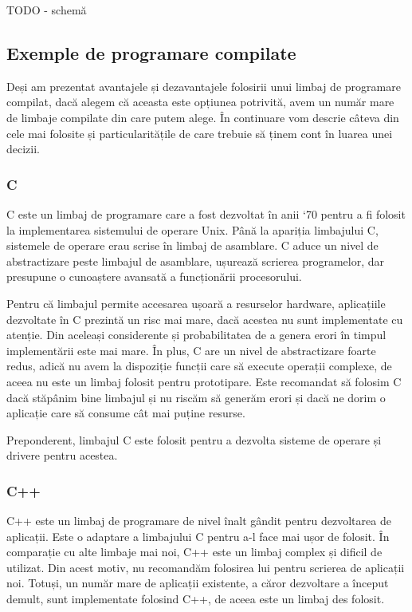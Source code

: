TODO - schemă

\subsection{Exemple de programare compilate}
\label{sec:appdev-langs-comp-ex}

Deși am prezentat avantajele și dezavantajele folosirii unui limbaj de
programare compilat, dacă alegem că aceasta este opțiunea potrivită, avem un
număr mare de limbaje compilate din care putem alege. În continuare vom descrie
câteva din cele mai folosite și particularitățile de care trebuie să ținem cont
în luarea unei decizii.

\subsubsection{C}
\label{sec:appdev-langs-comp-ex-c}

C este un limbaj de programare care a fost dezvoltat în anii ‘70 pentru a fi
folosit la implementarea sistemului de operare Unix. Până la apariția limbajului
C, sistemele de operare erau scrise în limbaj de asamblare. C aduce un nivel de
abstractizare peste limbajul de asamblare, ușurează scrierea programelor, dar
presupune o cunoaștere avansată a funcționării procesorului.

Pentru că limbajul permite accesarea ușoară a resurselor hardware, aplicațiile
dezvoltate în C prezintă un risc mai mare, dacă acestea nu sunt implementate cu
atenție. Din aceleași considerente și probabilitatea de a genera erori în timpul
implementării este mai mare. În plus, C are un nivel de abstractizare foarte
redus, adică nu avem la dispoziție funcții care să execute operații complexe, de
aceea nu este un limbaj folosit pentru prototipare. Este recomandat să folosim C
dacă stăpânim bine limbajul și nu riscăm să generăm erori și dacă ne dorim o
aplicație care să consume cât mai puține resurse.

Preponderent, limbajul C este folosit pentru a dezvolta sisteme de operare și
drivere pentru acestea.

\subsubsection{C++}
\label{sec:appdev-langs-comp-ex-cpp}

C++ este un limbaj de programare de nivel înalt gândit pentru dezvoltarea de
aplicații. Este o adaptare a limbajului C pentru a-l face mai ușor de folosit.
În comparație cu alte limbaje mai noi, C++ este un limbaj complex și dificil de
utilizat. Din acest motiv, nu recomandăm folosirea lui pentru scrierea de
aplicații noi. Totuși, un număr mare de aplicații existente, a căror dezvoltare
a început demult, sunt implementate folosind C++, de aceea este un limbaj des
folosit.

